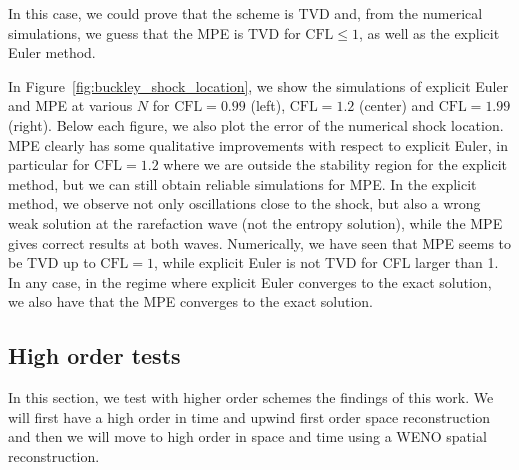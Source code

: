 \documentclass[final,11pt, times, linenumber, nopreprintline]{elsarticle}
\begin{document}
In this case, we could prove that the scheme is TVD and, from the numerical simulations, we guess that the MPE is TVD for $\text{CFL}\leq 1$, as well as the explicit Euler method.

In Figure~\ref{fig:buckley_shock_location}, we show the simulations of explicit Euler and MPE at various $N$ for $\text{CFL}=0.99$ (left), $\text{CFL}=1.2$ (center) and $\text{CFL}=1.99$ (right). Below each figure, we also plot the error of the numerical shock location. 
MPE clearly has some qualitative improvements with respect to explicit Euler, in particular for $\text{CFL}=1.2$ where we are outside the stability region for the explicit method, but we can still obtain reliable simulations for MPE. In the explicit method, we observe not only oscillations close to the shock, but also a wrong weak solution at the rarefaction wave (not the entropy solution), while the MPE gives correct results at both waves.
Numerically, we have seen that MPE seems to be TVD up to $\text{CFL}=1$, while explicit Euler is not TVD  for CFL larger than 1. 
In any case, in the regime where explicit Euler converges to the exact solution, we also have that the MPE converges to the exact solution.

\subsection{High order tests}
In this section, we test with higher order schemes the findings of this work. We will first have a high order in time and upwind first order space reconstruction and then we will move to high order in space and time using a WENO spatial reconstruction.
\end{document}

